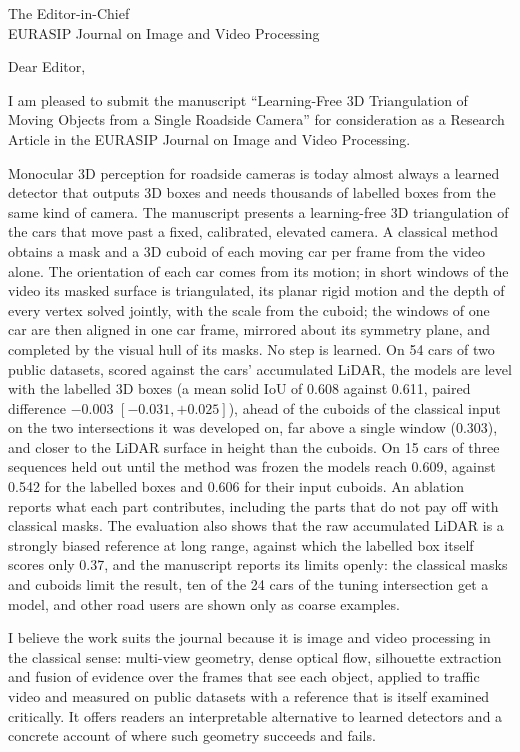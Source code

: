 \documentclass[11pt,a4paper]{letter}
\date{11 November 2026}
\begin{document}
\begin{letter}{The Editor-in-Chief\\EURASIP Journal on Image and Video Processing}
\opening{Dear Editor,}

I am pleased to submit the manuscript ``Learning-Free 3D Triangulation of Moving Objects from a Single Roadside Camera'' for consideration
as a Research Article in the EURASIP Journal on Image and Video Processing.

Monocular 3D perception for roadside cameras is today almost always a learned detector that outputs 3D boxes and
needs thousands of labelled boxes from the same kind of camera. The manuscript presents a learning-free 3D
triangulation of the cars that move past a fixed, calibrated, elevated camera. A classical method obtains a mask and
a 3D cuboid of each moving car per frame from the video alone. The orientation of each car comes from its motion; in
short windows of the video its masked surface is triangulated, its planar rigid motion and the depth of every vertex
solved jointly, with the scale from the cuboid; the windows of one car are then aligned in one car frame,
mirrored about its symmetry plane, and completed by the visual hull of its masks. No step is learned. On 54 cars of
two public datasets, scored against the cars' accumulated LiDAR, the models are level with the labelled 3D boxes
(a mean solid IoU of 0.608 against 0.611, paired difference $-0.003$ $[-0.031, +0.025]$), ahead of the cuboids of
the classical input on the two intersections it was developed on, far above a single window (0.303), and closer to the LiDAR surface in height than the cuboids. On 15 cars of three sequences held out until the method was frozen the models reach 0.609, against 0.542 for
the labelled boxes and 0.606 for their input cuboids. An ablation reports what each part contributes, including the parts that do not pay off with classical masks. The
evaluation also shows that the raw accumulated LiDAR is a strongly biased reference at long range, against which
the labelled box itself scores only 0.37, and the manuscript reports its limits openly: the classical masks and
cuboids limit the result, ten of the 24 cars of the tuning intersection get a model, and other road users are
shown only as coarse examples.

I believe the work suits the journal because it is image and video processing in the classical sense: multi-view
geometry, dense optical flow, silhouette extraction and fusion of evidence over the frames that see each object, applied to traffic
video and measured on public datasets with a reference that is itself examined critically. It offers readers an
interpretable alternative to learned detectors and a concrete account of where such geometry succeeds and fails.


\end{letter}
\end{document}
